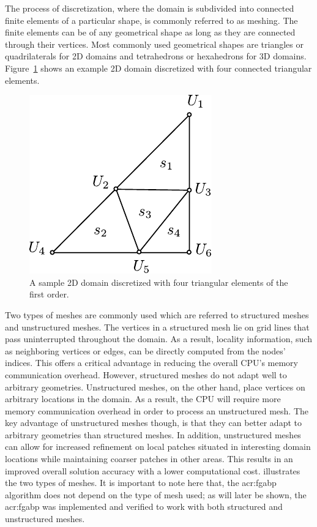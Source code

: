 The process of discretization, where the domain is subdivided into connected finite elements of a particular shape, is commonly referred to as meshing.
The finite elements can be of any geometrical shape as long as they are connected through their vertices.
Most commonly used geometrical shapes are triangles or quadrilaterals for 2D domains and tetrahedrons or hexahedrons for 3D domains.
Figure~\ref{fig:disc_domain} shows an example 2D domain discretized with four connected triangular elements.


\begin{figure}
	\centering
	\includegraphics[scale=1.0]{disc_domain}
	\caption{A sample 2D domain discretized with four triangular elements of the first order.}
	\label{fig:disc_domain}
\end{figure}


Two types of meshes are commonly used which are referred to structured meshes and unstructured meshes.
The vertices in a structured mesh lie on grid lines that pass uninterrupted throughout the domain.
As a result, locality information, such as neighboring vertices or edges, can be directly computed from the nodes' indices.
This offers a critical advantage in reducing the overall CPU's memory communication overhead.
However, structured meshes do not adapt well to arbitrary geometries.
Unstructured meshes, on the other hand, place vertices on arbitrary locations in the domain.
As a result, the CPU will require more memory communication overhead in order to process an unstructured mesh.
The key advantage of unstructured meshes though, is that they can better adapt to arbitrary geometries than structured meshes.
In addition, unstructured meshes can allow for increased refinement on local patches situated in interesting domain locations while maintaining coarser patches in other areas.
This results in an improved overall solution accuracy with a lower computational cost.
 illustrates the two types of meshes.
It is important to note here that, the \gls{acr:fgabp} algorithm does not depend on the type of mesh used; as will later be shown, the \gls{acr:fgabp} was implemented and verified to work with both structured and unstructured meshes.


